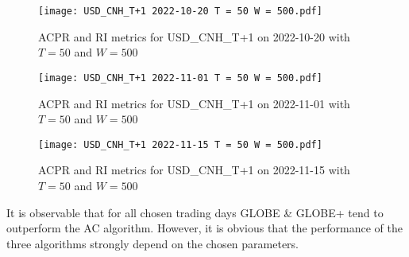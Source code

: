         \begin{figure}[htbp]
            \texttt{[image: USD\_CNH\_T+1 2022-10-20 T = 50 W = 500.pdf]}
            \caption{ACPR and RI metrics for USD\_CNH\_T+1 on 2022-10-20 with $T = 50$ and $W = 500$}\label{fig:backtest2}
        \end{figure}
        
        \begin{figure}[htbp]
            \texttt{[image: USD\_CNH\_T+1 2022-11-01 T = 50 W = 500.pdf]}
            \caption{ACPR and RI metrics for USD\_CNH\_T+1 on 2022-11-01 with $T = 50$ and $W = 500$}\label{fig:backtest3}
        \end{figure}
        
        \begin{figure}[htbp]
            \texttt{[image: USD\_CNH\_T+1 2022-11-15 T = 50 W = 500.pdf]}
            \caption{ACPR and RI metrics for USD\_CNH\_T+1 on 2022-11-15 with $T = 50$ and $W = 500$}\label{fig:backtest4}
        \end{figure}

        It is observable that for all chosen trading days GLOBE \& GLOBE+ tend to outperform the AC algorithm.
        However, it is obvious that the performance of the three algorithms strongly depend on the chosen parameters.